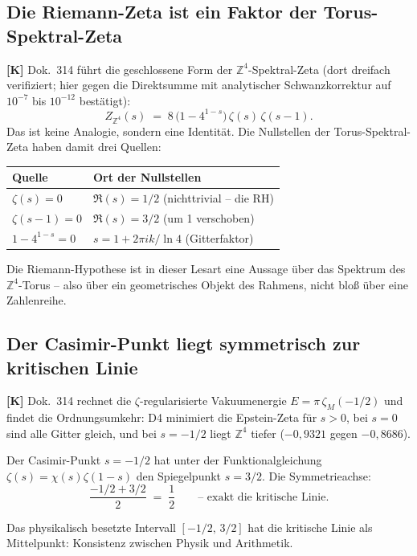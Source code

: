 \subsection{Die Riemann-Zeta ist ein Faktor der Torus-Spektral-Zeta}

\textbf{[K]} Dok.~314 f\"uhrt die geschlossene Form der
$\mathbb{Z}^4$-Spektral-Zeta (dort dreifach verifiziert; hier gegen die
Direktsumme mit analytischer Schwanzkorrektur auf $10^{-7}$ bis
$10^{-12}$ best\"atigt):
\[
  Z_{\mathbb{Z}^4}(s) \;=\; 8\,\bigl(1 - 4^{1-s}\bigr)\,
  \zeta(s)\,\zeta(s-1).
\]
Das ist keine Analogie, sondern eine Identit\"at. Die Nullstellen der
Torus-Spektral-Zeta haben damit drei Quellen:

\begin{center}
\begin{tabular}{ll}
\toprule
Quelle & Ort der Nullstellen \\
\midrule
$\zeta(s) = 0$ & $\Re(s) = 1/2$ (nichttrivial -- die RH) \\
$\zeta(s-1) = 0$ & $\Re(s) = 3/2$ (um 1 verschoben) \\
$1 - 4^{1-s} = 0$ & $s = 1 + 2\pi i k/\ln 4$ (Gitterfaktor) \\
\bottomrule
\end{tabular}
\end{center}

Die Riemann-Hypothese ist in dieser Lesart eine Aussage \"uber das
Spektrum des $\mathbb{Z}^4$-Torus -- also \"uber ein geometrisches
Objekt des Rahmens, nicht blo\ss{} \"uber eine Zahlenreihe.

\subsection{Der Casimir-Punkt liegt symmetrisch zur kritischen Linie}
\label{sec:casimir}

\textbf{[K]} Dok.~314 rechnet die $\zeta$-regularisierte Vakuumenergie
$E = \pi\,\zeta_M(-1/2)$ und findet die Ordnungsumkehr: D4 minimiert die
Epstein-Zeta f\"ur $s > 0$, bei $s = 0$ sind alle Gitter gleich, und bei
$s = -1/2$ liegt $\mathbb{Z}^4$ tiefer ($-0{,}9321$ gegen $-0{,}8686$).

Der Casimir-Punkt $s = -1/2$ hat unter der Funktionalgleichung
$\zeta(s) = \chi(s)\zeta(1-s)$ den Spiegelpunkt $s = 3/2$. Die
Symmetrieachse:
\[
  \frac{-1/2 + 3/2}{2} \;=\; \frac12
  \qquad\text{-- exakt die kritische Linie.}
\]

Das physikalisch besetzte Intervall $[-1/2,\,3/2]$ hat die kritische
Linie als Mittelpunkt: Konsistenz zwischen Physik und Arithmetik.

